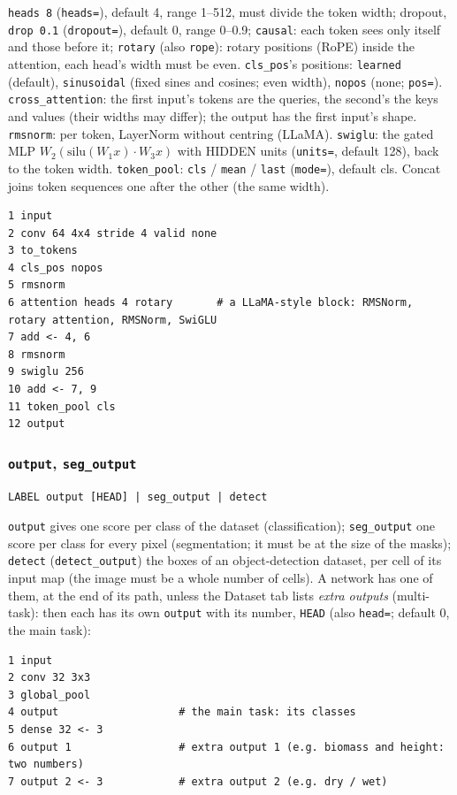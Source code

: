 \texttt{heads 8} (\texttt{heads=}), default 4, range 1--512, must divide the token width; dropout, \texttt{drop 0.1}
(\texttt{dropout=}), default 0, range 0--0.9; \texttt{causal}: each token sees only itself and those before it; \texttt{rotary} (also
\texttt{rope}): rotary positions (RoPE) inside the attention, each head's width must be even. \texttt{cls\_pos}'s positions:
\texttt{learned} (default), \texttt{sinusoidal} (fixed sines and cosines; even width), \texttt{nopos} (none; \texttt{pos=}).
\texttt{cross\_attention}: the first input's tokens are the queries, the second's the keys and values (their widths may differ); the
output has the first input's shape. \texttt{rmsnorm}: per token, LayerNorm without centring (LLaMA). \texttt{swiglu}: the gated MLP
$W_2(\mathrm{silu}(W_1x)\cdot W_3x)$ with HIDDEN units (\texttt{units=}, default 128), back to the token width. \texttt{token\_pool}:
\texttt{cls} / \texttt{mean} / \texttt{last} (\texttt{mode=}), default cls. Concat joins token sequences one after the other
(the same width).
\begin{verbatim}
1 input
2 conv 64 4x4 stride 4 valid none
3 to_tokens
4 cls_pos nopos
5 rmsnorm
6 attention heads 4 rotary       # a LLaMA-style block: RMSNorm, rotary attention, RMSNorm, SwiGLU
7 add <- 4, 6
8 rmsnorm
9 swiglu 256
10 add <- 7, 9
11 token_pool cls
12 output
\end{verbatim}

\subsubsection*{\texttt{output}, \texttt{seg\_output}}
\begin{Verbatim}[fontsize=\small]
LABEL output [HEAD] | seg_output | detect
\end{Verbatim}
\texttt{output} gives one score per class of the dataset (classification); \texttt{seg\_output} one score per class for every pixel
(segmentation; it must be at the size of the masks); \texttt{detect} (\texttt{detect\_output}) the boxes of an object-detection
dataset, per cell of its input map (the image must be a whole number of cells). A network has one of them, at the end of its path, unless the Dataset tab lists
\emph{extra outputs} (multi-task): then each has its own \texttt{output} with its number, \texttt{HEAD} (also \texttt{head=}; default 0,
the main task):
\begin{verbatim}
1 input
2 conv 32 3x3
3 global_pool
4 output                   # the main task: its classes
5 dense 32 <- 3
6 output 1                 # extra output 1 (e.g. biomass and height: two numbers)
7 output 2 <- 3            # extra output 2 (e.g. dry / wet)
\end{verbatim}

